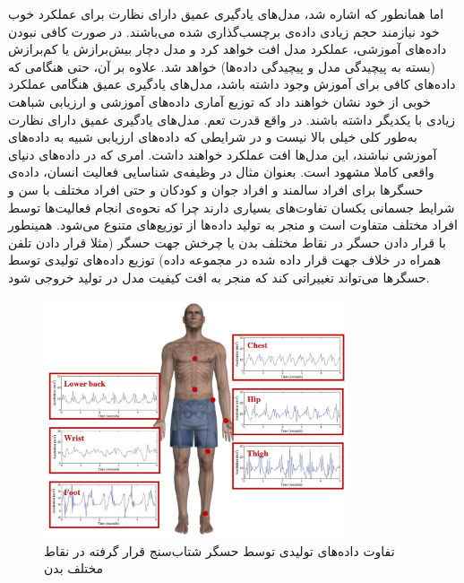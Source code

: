 اما همانطور که اشاره شد، مدل‌های یادگیری عمیق
دارای نظارت
برای عملکرد خوب خود نیازمند حجم زیادی داده‌ی برچسب‌گذاری شده می‌باشند. در صورت کافی نبودن داده‌های آموزشی، عملکرد مدل افت خواهد کرد و مدل دچار
بیش‌برازش
یا کم‌برازش
(بسته به پیچیدگی مدل و پیچیدگی داده‌ها)
خواهد شد. علاوه بر آن، حتی هنگامی که داده‌های کافی برای آموزش وجود داشته باشد، مدل‌های یادگیری عمیق هنگامی عملکرد خوبی از خود نشان خواهند داد که توزیع آماری داده‌های آموزشی و ارزیابی شباهت زیادی با یکدیگر داشته باشند. در واقع
قدرت تعم.
مدل‌های یادگیری عمیق دارای نظارت به‌طور کلی خیلی بالا نیست و در شرایطی که داده‌های ارزیابی شبیه به داده‌های آموزشی نباشند، این مدل‌ها افت عملکرد خواهند داشت\cite{recht2019imagenet}.
امری که در داده‌های دنیای واقعی کاملا مشهود است. بعنوان مثال در وظیفه‌ی شناسایی فعالیت انسان، داده‌ی حسگرها برای افراد سالمند و افراد جوان و کودکان و حتی افراد مختلف با سن و شرایط جسمانی یکسان تفاوت‌های بسیاری دارند چرا که نحوه‌ی انجام فعالیت‌ها توسط افراد مختلف متفاوت است و منجر به تولید داده‌ها از توزیع‌های متنوع می‌شود. همینطور با قرار دادن حسگر در نقاط مختلف بدن یا چرخش جهت حسگر (مثلا قرار دادن تلفن همراه در خلاف جهت قرار داده شده در مجموعه داده) توزیع داده‌های تولیدی توسط حسگرها می‌تواند تغییراتی کند که منجر به افت کیفیت مدل در تولید خروجی شود\cite{cleland2013optimal}.
\begin{figure}[htbp]
  \centering
  \includegraphics[width=0.8\textwidth]{Images/Chapter1/accelerometer-placement.png}
  \caption{تفاوت داده‌های تولیدی توسط حسگر شتاب‌سنج قرار گرفته در نقاط مختلف بدن}
  \label{fig:accelerometer-placement}
\end{figure}

